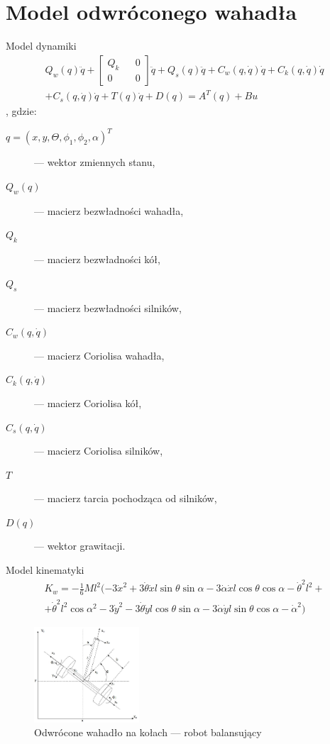\section{Model odwróconego wahadła}
\begin{frame}[allowframebreaks]{Model dynamiki}
  \begin{align} \nonumber
    Q_w(q)\ddot{q}+
    \begin{bmatrix}
      Q_k && 0 \\
      0   && 0
    \end{bmatrix}
    \ddot{q}+
    Q_s(q)\ddot{q}
    +C_w(q, \dot{q})
    \dot{q}+C_k(q, \dot{q})\dot{q}\\ \nonumber 
    +C_s(q, \dot{q})\dot{q}
    +T(q)\dot{q}+D(q)=A^T(q)+Bu
  \end{align}, gdzie:
  \begin{description}
  	\item[$q=(x, y, \Theta, \phi_1, \phi_2, \alpha )^T$] --- wektor zmiennych stanu,
  	\item[$Q_w(q)$] --- macierz bezwładności wahadła,
  	\item[$Q_k$] --- macierz bezwładności kół,
  	\item[$Q_s$] --- macierz bezwładności silników,
  	\item[$C_w(q, \dot{q})$] --- macierz Coriolisa wahadła,
  	\item[$C_k(q, \dot{q})$] --- macierz Coriolisa kół,
  	\item[$C_s(q, \dot{q})$] --- macierz Coriolisa silników,
  	\item[$T$]               --- macierz tarcia pochodząca od silników,
  	\item[$D(q)$]            --- wektor grawitacji.
  \end{description}
  
\end{frame}

\begin{frame}{Model kinematyki}
	\begin{align}
	  \nonumber
		K_w = -\frac{1}{6}Ml^2(-3\dot{x}^2 +3\dot{\theta}\dot{x} l \sin{\theta}\sin{\alpha}
		-3\dot{\alpha}\dot{x}l \cos{\theta} \cos{\alpha} - \dot{\theta}^2l^2+\\
	  \nonumber
	    +\dot{\theta}^2 l^2 \cos{\alpha^2} - 3\dot{y}^2 -
	    3 \dot{\theta}\dot{y}l\cos{\theta}\sin{\alpha} - 3 \dot{\alpha}\dot{y}l
	    \sin{\theta}\cos{\alpha}-\dot{\alpha}^2
		)
	\end{align}
	\begin{figure}
		\includegraphics[width=0.35\textwidth]{img/wahadlo}
		\caption{Odwrócone wahadło na kołach --- robot balansujący}
	\end{figure}
\end{frame}

